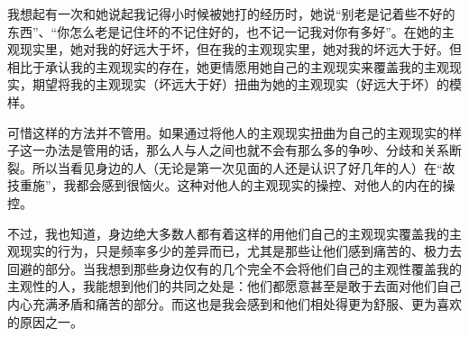 我想起有一次和她说起我记得小时候被她打的经历时，她说“别老是记着些不好的东西”、“你怎么老是记住坏的不记住好的，也不记一记我对你有多好”。在她的主观现实里，她对我的好远大于坏，但在我的主观现实里，她对我的坏远大于好。但相比于承认我的主观现实的存在，她更情愿用她自己的主观现实来覆盖我的主观现实，期望将我的主观现实（坏远大于好）扭曲为她的主观现实（好远大于坏）的模样。

可惜这样的方法并不管用。如果通过将他人的主观现实扭曲为自己的主观现实的样子这一办法是管用的话，那么人与人之间也就不会有那么多的争吵、分歧和关系断裂。所以当看见身边的人（无论是第一次见面的人还是认识了好几年的人）在“故技重施”，我都会感到很恼火。这种对他人的主观现实的操控、对他人的内在的操控。

不过，我也知道，身边绝大多数人都有着这样的用他们自己的主观现实覆盖我的主观现实的行为，只是频率多少的差异而已，尤其是那些让他们感到痛苦的、极力去回避的部分。当我想到那些身边仅有的几个完全不会将他们自己的主观性覆盖我的主观性的人，我能想到他们的共同之处是：他们都愿意甚至是敢于去面对他们自己内心充满矛盾和痛苦的部分。而这也是我会感到和他们相处得更为舒服、更为喜欢的原因之一。


